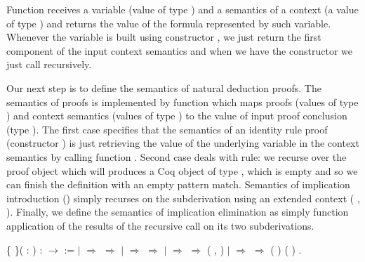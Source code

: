 Function  receives a variable (value of type   ) and a semantics
of a context (a value of type  ) and returns the value of the formula
represented by such variable. Whenever the variable is built using constructor ,
we just return the first component of the input context semantics and when we have
the constructor  we just call   recursively.


Our next step is to define the semantics of natural deduction proofs. The semantics of
proofs is implemented by function  which maps proofs (values of type   )
and context semantics (values of type  ) to the value of input proof conclusion
(type  ). The first case specifies that the semantics of an identity rule proof
(constructor ) is just retrieving the value of the underlying variable in the context semantics
by calling function . Second case deals with  rule: we recurse over the proof
object  which will produces a Coq object of type , which is empty and so we can finish the
definition with an empty pattern match. Semantics of implication introduction () simply
recurses on the subderivation  using an extended context ( , ). Finally, we define the
semantics of implication elimination as simply function application of the results of the
recursive call on its two subderivations.
\begin{coqdoccode}
\coqdocemptyline
\coqdocnoindent
{}  \{ \}( :   )\coqdoceol
\coqdocindent{1.00em}
:   \ensuremath{\rightarrow}   :=\coqdoceol
\coqdocindent{1.00em}
  \coqdoceol
\coqdocindent{1.00em}
\ensuremath{|}   \ensuremath{\Rightarrow}   \ensuremath{\Rightarrow}   \coqdoceol
\coqdocindent{1.00em}
\ensuremath{|}   \ensuremath{\Rightarrow}   \ensuremath{\Rightarrow}\coqdoceol
\coqdocindent{3.00em}
    \coqdoceol
\coqdocindent{3.00em}
\coqdoceol
\coqdocindent{1.00em}
\ensuremath{|}   \ensuremath{\Rightarrow}    \ensuremath{\Rightarrow}   ( , )\coqdoceol
\coqdocindent{1.00em}
\ensuremath{|}    \ensuremath{\Rightarrow}   \ensuremath{\Rightarrow} (  ) (  )\coqdoceol
\coqdocindent{1.00em}
.\coqdoceol
\coqdocemptyline
\end{coqdoccode}

